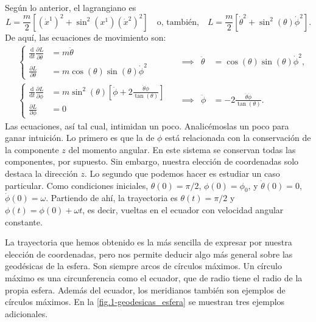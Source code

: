 \begin{example}
    Según lo anterior, el lagrangiano es
    \begin{equation*}
        L = \frac{m}{2}\left[\left(\dot{x}^1\right)^2 + \sin^2\left(x^1\right)\left(\dot{x}^2\right)^2\right] \quad \text{o, también,}\quad
        L = \frac{m}{2}\left[\dot{\theta}^2 + \sin^2(\theta)\dot{\phi}^2\right].
    \end{equation*}
    De aquí, las ecuaciones de movimiento son:
    \begin{align*}
        &\left\{\begin{aligned}
            \frac{\mathrm{d}}{\mathrm{d}t}\frac{\partial L}{\partial \dot{\theta}} &= m\ddot{\theta}\\
            \frac{\partial L}{\partial \theta} &= m\cos(\theta)\sin(\theta) \dot{\phi}^2
        \end{aligned}\right. &&\implies &\ddot{\theta} &= \cos(\theta)\sin(\theta)\dot{\phi}^2, \\
        &\left\{\begin{aligned}
            \frac{\mathrm{d}}{\mathrm{d}t}\frac{\partial L}{\partial \dot{\phi}} &= m\sin^2(\theta)\left[\ddot{\phi} + 2\frac{\dot{\theta}\dot{\phi}}{\tan(\theta)}\right]\\
            \frac{\partial L}{\partial \phi} &= 0
        \end{aligned}\right. &&\implies &\ddot{\phi} &= -2\frac{\dot{\theta}\dot{\phi}}{\tan(\theta)}. 
    \end{align*}
    Las ecuaciones, así tal cual, intimidan un poco. Analicémoslas un poco para ganar intuición. Lo primero es que la de \(\phi\) está relacionada con la conservación de la componente \(z\) del momento angular. En este sistema se conservan todas las componentes, por supuesto. Sin embargo, nuestra elección de coordenadas solo destaca la dirección \(z\). Lo segundo que podemos hacer es estudiar un caso particular. Como condiciones iniciales, \(\theta(0)=\pi/2\), \(\phi(0) = \phi_0\), y \(\dot{\theta}(0)=0\), \(\dot{\phi}(0) = \omega\). Partiendo de ahí, la trayectoria es \(\theta(t) = \pi/2\) y \(\phi(t) = \phi(0) + \omega t\), es decir, vueltas en el ecuador con velocidad angular constante. 
    
    La trayectoria que hemos obtenido es la más sencilla de expresar por nuestra elección de coordenadas, pero nos permite deducir algo más general sobre las geodésicas de la esfera. Son siempre arcos de círculos máximos. Un círculo máximo es una circunferencia como el ecuador, que de radio tiene el radio de la propia esfera. Además del ecuador, los meridianos también son ejemplos de círculos máximos. En la \cref{fig.1-geodesicas_esfera} se muestran tres ejemplos adicionales.


\end{example}
